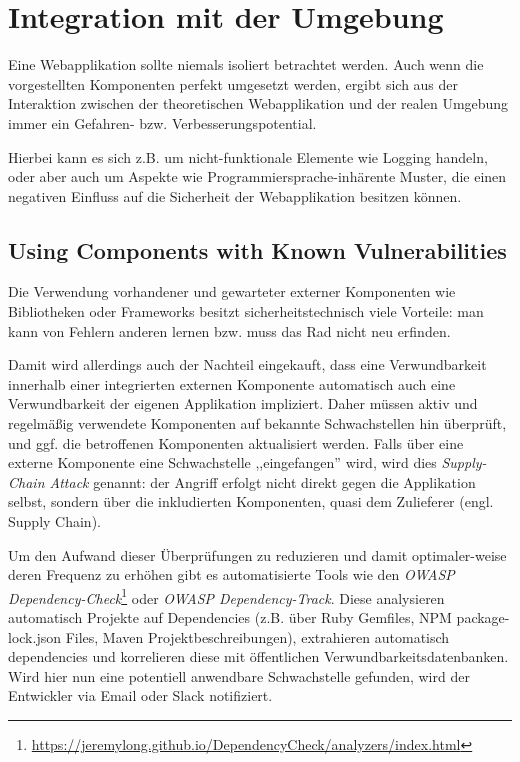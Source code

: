 \chapter{Integration mit der Umgebung}

Eine Webapplikation sollte niemals isoliert betrachtet werden. Auch wenn die vorgestellten Komponenten perfekt umgesetzt werden, ergibt sich aus der Interaktion zwischen der theoretischen Webapplikation und der realen Umgebung immer ein Gefahren- bzw. Verbesserungspotential.

Hierbei kann es sich z.B. um nicht-funktionale Elemente wie Logging handeln, oder aber auch um Aspekte wie Programmiersprache-inhärente Muster, die einen negativen Einfluss auf die Sicherheit der Webapplikation besitzen können.

\section{Using Components with Known Vulnerabilities}

Die Verwendung vorhandener und gewarteter externer Komponenten wie Bibliotheken oder Frameworks besitzt sicherheitstechnisch viele Vorteile: man kann von Fehlern anderen lernen bzw. muss das Rad nicht neu erfinden.

Damit wird allerdings auch der Nachteil eingekauft, dass eine Verwundbarkeit innerhalb einer integrierten externen Komponente automatisch auch eine Verwundbarkeit der eigenen Applikation impliziert. Daher müssen aktiv und regelmäßig verwendete Komponenten auf bekannte Schwachstellen hin überprüft, und ggf. die betroffenen Komponenten aktualisiert werden. Falls über eine externe Komponente eine Schwachstelle ,,eingefangen'' wird, wird dies \textit{Supply-Chain Attack} genannt: der Angriff erfolgt nicht direkt gegen die Applikation selbst, sondern über die inkludierten Komponenten, quasi dem Zulieferer (engl. Supply Chain).

Um den Aufwand dieser Überprüfungen zu reduzieren und damit optimaler-weise deren Frequenz zu erhöhen gibt es automatisierte Tools wie den \textit{OWASP Dependency-Check}\footnote{\url{https://jeremylong.github.io/DependencyCheck/analyzers/index.html}} oder \textit{OWASP Dependency-Track}. Diese analysieren automatisch Projekte auf Dependencies (z.B. über Ruby Gemfiles, NPM package-lock.json Files, Maven Projektbeschreibungen), extrahieren automatisch dependencies und korrelieren diese mit öffentlichen Verwundbarkeitsdatenbanken. Wird hier nun eine potentiell anwendbare Schwachstelle gefunden, wird der Entwickler via Email oder Slack notifiziert.

